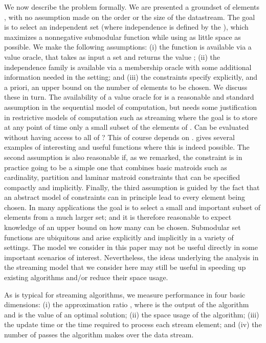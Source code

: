 \documentclass[oneside,letterpaper]{scrartcl} \usepackage{macros}
\begin{document}
We now describe the problem formally. We are presented a groundset of
elements , with no assumption
made on the order or the size of the datastream. The goal is to select
an independent set  (where independence is
defined by the ), which maximizes
a nonnegative submodular function  while using as little space as
possible. We make the following assumptions: (i) the function  is
available via a value oracle, that takes as input a set  and returns the value ; (ii) the independence family
 is available via a membership oracle with some
additional information needed in the  setting;
and (iii) the constraints specify explicitly, and a priori, an upper
bound  on the number of elements to be chosen. We discuss these in
turn.  The availability of a value oracle for  is a reasonable and
standard assumption in the sequential model of computation, but needs
some justification in restrictive models of computation such as
streaming where the goal is to store at any point of time only a small
subset of the elements of . Can  be evaluated
without having access to all of ? This of course depends
on . \cite{bmkk-sso-14} gives several examples of interesting and
useful functions where this is indeed possible. The second assumption
is also reasonable if, as we remarked, the 
constraint is in practice going to be a simple one that combines basic
matroids such as cardinality, partition and laminar matroid
constraints that can be specified compactly and implicitly. Finally,
the third assumption is guided by the fact that an abstract model of
constraints can in principle lead to every element being chosen. In
many applications the goal is to select a small and important subset
of elements from a much larger set; and it is therefore reasonable to
expect knowledge of an upper bound on how many can be chosen.
Submodular set functions are ubiquitous and arise explicitly and
implicitly in a variety of settings. The model we consider in this
paper may not be useful directly in some important scenarios of
interest. Nevertheless, the ideas underlying the analysis in the
streaming model that we consider here may still be useful in speeding
up existing algorithms and/or reduce their space usage.


As is typical for streaming algorithms, we measure performance in four
basic dimensions: (i) the approximation ratio , where 
is the output of the algorithm and  is the value of an optimal
solution; (ii) the space usage of the algorithm; (iii) the update time
or the time required to process each stream element; and (iv) the
number of passes the algorithm makes over the data stream.
\end{document}
